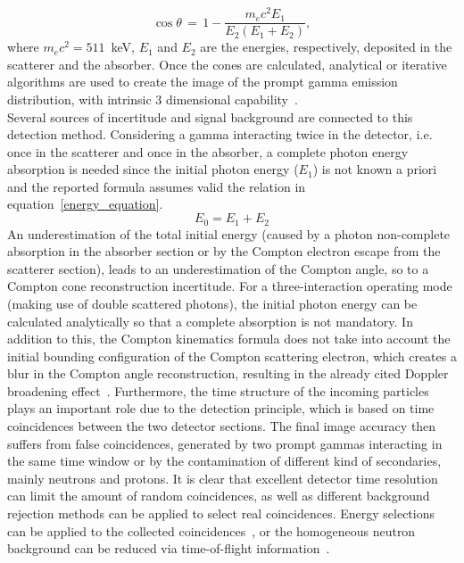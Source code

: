 \begin{equation}
\cos\theta\,=\,1-\frac{m_{e}c^{2}E_{1}}{E_{2}(E_{1}+E_{2})},
\label{Compton_equation}
\end{equation} 
where \(m_{e}c^{2} = 511\)~keV, \(E_{1}\) and \(E_{2}\) are the energies, respectively, deposited in the scatterer and the absorber. 
Once the cones are calculated, analytical or iterative algorithms are used to create the image of the prompt gamma emission distribution, with intrinsic 3 dimensional capability~\cite{McKisson3D, Kuchment:2016uiw}. \\

Several sources of incertitude and signal background are connected to this detection method. Considering a gamma interacting twice in the detector, i.e. once in the scatterer and once in the absorber, a complete photon energy absorption is needed since the initial photon energy (\(E_{1}\)) is not known a priori and the reported formula assumes valid the relation in equation~\ref{energy_equation}.
 \begin{equation}
E_{0} = E_{1}+E_{2}
\label{energy_equation}
\end{equation} 
An underestimation of the total initial energy (caused by a photon non-complete absorption in the absorber section or by the Compton electron escape from the scatterer section), leads to an underestimation of the Compton angle, so to a Compton cone reconstruction incertitude. For a three-interaction operating mode (making use of double scattered photons), the initial photon energy can be calculated analytically so that a complete absorption is not mandatory. In addition to this, the Compton kinematics formula does not take into account the initial bounding configuration of the Compton scattering electron, which creates a blur in the Compton angle reconstruction, resulting in the already cited Doppler broadening effect~\cite{Doppler}. Furthermore, the time structure of the incoming particles plays an important role due to the detection principle, which is based on time coincidences between the two detector sections. The final image accuracy then suffers from false coincidences, generated by two prompt gammas interacting in the same time window or by the contamination of different kind of secondaries, mainly neutrons and protons. It is clear that excellent detector time resolution can limit the amount of random coincidences, as well as different background rejection methods can be applied to select real coincidences. Energy selections can be applied to the collected coincidences~\cite{Polf:2009aa, Hilaire:2016aa}, or the homogeneous neutron background can be reduced via time-of-flight information~\cite{Testa:2010aa}.\\
